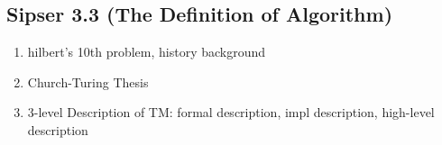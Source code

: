 \documentclass{article}
\begin{document}
\subsection{Sipser 3.3 (The Definition of Algorithm)}

\begin{enumerate}
  \item hilbert's 10th problem, history background
  \item Church-Turing Thesis
  \item 3-level Description of TM: formal description, impl description, high-level description
\end{enumerate}
\end{document}
